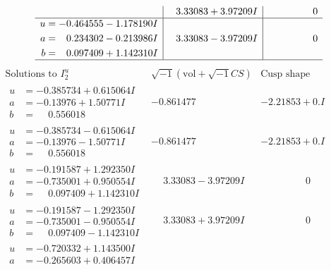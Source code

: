 \documentclass[1p]{elsarticle_modified}
\theoremstyle{definition}
\newcommand{\I}{\sqrt{-1}}
\begin{document}
$$\begin{array}{c|c|c}
 & \phantom{-}3.33083 + 3.97209 I & \phantom{-0.000000 } 0 \\ \hline\begin{aligned}
u &= -0.464555 - 1.178190 I \\
a &= \phantom{-}0.234302 - 0.213986 I \\
b &= \phantom{-}0.097409 + 1.142310 I\end{aligned}
 & \phantom{-}3.33083 - 3.97209 I & \phantom{-0.000000 } 0\\
 \hline 
 \end{array}$$\newpage$$\begin{array}{c|c|c}  
\text{Solutions to }I^u_{2}& \I (\text{vol} + \sqrt{-1}CS) & \text{Cusp shape}\\
 \hline 
\begin{aligned}
u &= -0.385734 + 0.615064 I \\
a &= -0.13976 + 1.50771 I \\
b &= \phantom{-}0.556018\phantom{ +0.000000I}\end{aligned}
 & -0.861477\phantom{ +0.000000I} & -2.21853 + 0. I\phantom{ +0.000000I} \\ \hline\begin{aligned}
u &= -0.385734 - 0.615064 I \\
a &= -0.13976 - 1.50771 I \\
b &= \phantom{-}0.556018\phantom{ +0.000000I}\end{aligned}
 & -0.861477\phantom{ +0.000000I} & -2.21853 + 0. I\phantom{ +0.000000I} \\ \hline\begin{aligned}
u &= -0.191587 + 1.292350 I \\
a &= -0.735001 + 0.950554 I \\
b &= \phantom{-}0.097409 + 1.142310 I\end{aligned}
 & \phantom{-}3.33083 - 3.97209 I & \phantom{-0.000000 } 0 \\ \hline\begin{aligned}
u &= -0.191587 - 1.292350 I \\
a &= -0.735001 - 0.950554 I \\
b &= \phantom{-}0.097409 - 1.142310 I\end{aligned}
 & \phantom{-}3.33083 + 3.97209 I & \phantom{-0.000000 } 0 \\ \hline\begin{aligned}
u &= -0.720332 + 1.143500 I \\
a &= -0.265603 + 0.406457 I \\

\end{aligned}
\end{array}$$
\end{document}
